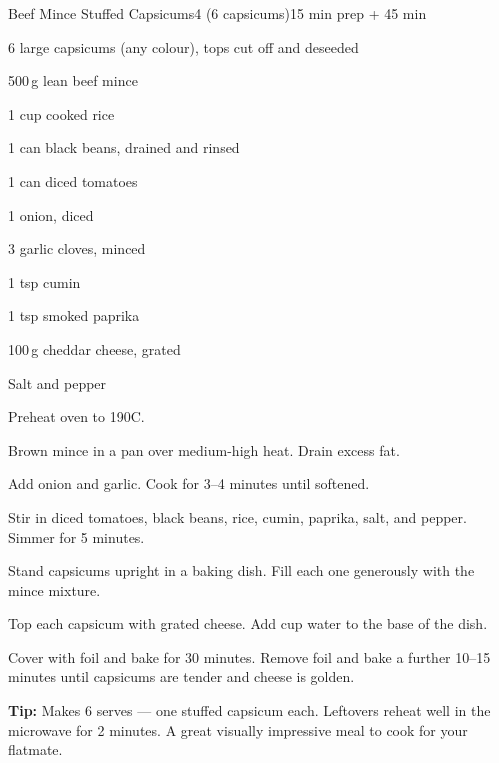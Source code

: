 \begin{recipebox}{Beef Mince Stuffed Capsicums}{4 (6 capsicums)}{15 min prep + 45 min}
\begin{ingredients}
  \item 6 large capsicums (any colour), tops cut off and deseeded
  \item 500\,g lean beef mince
  \item 1 cup cooked rice
  \item 1 can black beans, drained and rinsed
  \item 1 can diced tomatoes
  \item 1 onion, diced
  \item 3 garlic cloves, minced
  \item 1 tsp cumin
  \item 1 tsp smoked paprika
  \item 100\,g cheddar cheese, grated
  \item Salt and pepper
\end{ingredients}

\begin{method}
  \item Preheat oven to 190\textdegree C.
  \item Brown mince in a pan over medium-high heat. Drain excess fat.
  \item Add onion and garlic. Cook for 3--4 minutes until softened.
  \item Stir in diced tomatoes, black beans, rice, cumin, paprika, salt, and pepper. Simmer for 5 minutes.
  \item Stand capsicums upright in a baking dish. Fill each one generously with the mince mixture.
  \item Top each capsicum with grated cheese. Add \textonehalf{} cup water to the base of the dish.
  \item Cover with foil and bake for 30 minutes. Remove foil and bake a further 10--15 minutes until capsicums are tender and cheese is golden.
\end{method}

\begin{notelist}
  \item \textbf{Tip:} Makes 6 serves --- one stuffed capsicum each. Leftovers reheat well in the microwave for 2 minutes. A great visually impressive meal to cook for your flatmate.
\end{notelist}
\end{recipebox}
